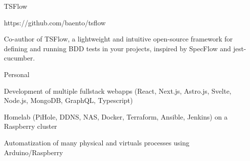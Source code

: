 
\begin{cventries}
  \cventry
    {} %
    {TSFlow} %
    {} %
    {} %
    {
      \begin{cvitems} %
        \item {https://github.com/baento/tsflow}
        \item {Co-author of TSFlow, a lightweight and intuitive open-source framework for defining and running BDD tests in your projects, inspired by SpecFlow and jest-cucumber.}
      \end{cvitems}
    }

  \cventry
    {} %
    {Personal} %
    {} %
    {} %
    {
      \begin{cvitems} %
        \item {Development of multiple fullstack webapps (React, Next.js, Astro.js, Svelte, Node.js, MongoDB, GraphQL, Typescript)}
        \item {Homelab (PiHole, DDNS, NAS, Docker, Terraform, Ansible, Jenkins) on a Raspberry cluster}
		\item {Automatization of many physical and virtuals processes using Arduino/Raspberry}
      \end{cvitems}
    }

\end{cventries}